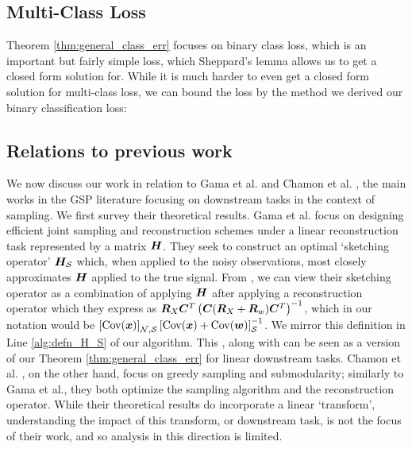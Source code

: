 \subsection{{\color{blue}Multi-Class Loss}}
{\color{blue} Theorem \ref{thm:general_class_err} focuses on binary class loss, which is an important but fairly simple loss, which Sheppard's lemma allows us to get a closed form solution for. While it is much harder to even get a closed form solution for multi-class loss, we can bound the loss by the method we derived our binary classification loss:
\begin{remark}
    
\end{remark}

}
\subsection{Relations to previous work}
We now discuss our work in relation to Gama et al. \cite{gama2020rethinking} and Chamon et al. \cite{chamon2017greedy}, the main works in the GSP literature focusing on downstream tasks in the context of sampling. We first survey their theoretical results. Gama et al. focus on designing efficient joint sampling and reconstruction schemes under a linear reconstruction task represented by a matrix $\bm{H}$. They seek to construct an optimal `sketching operator' $\bm{H}_{\mathcal{S}}$ which, when applied to the noisy observations, most closely approximates $\bm{H}$ applied to the true signal. From \cite[Proposition 2]{gama2020rethinking}, we can view their sketching operator as a combination of applying $\bm{H}$ after applying a reconstruction operator which they express as $\bm{R}_{X}\bm{C}^{T}\left(\bm{C}(\bm{R}_{X} + \bm{R}_{w})\bm{C}^{T}\right)^{-1}$, which in our notation would be $\msubgen[\set{N},\set{S}]{\text{Cov}(\vect{x})}\msubgen[\set{S}]{\text{Cov}(\matr{x}) + \text{Cov}(\matr{w})}^{-1}$. We mirror this definition in Line \ref{alg:defn_H_S} of our algorithm.  This \cite[Proposition 2]{gama2020rethinking}, along with \cite[(17) \& (18)]{gama2020rethinking} can be seen as a version of our Theorem \ref{thm:general_class_err} for linear downstream tasks. Chamon et al. \cite{chamon2017greedy}, on the other hand, focus on greedy sampling and submodularity; similarly to Gama et al., they both optimize the sampling algorithm and the reconstruction operator. While their theoretical results do incorporate a linear `transform', understanding the impact of this transform, or downstream task, is not the focus of their work, and so analysis in this direction is limited.

